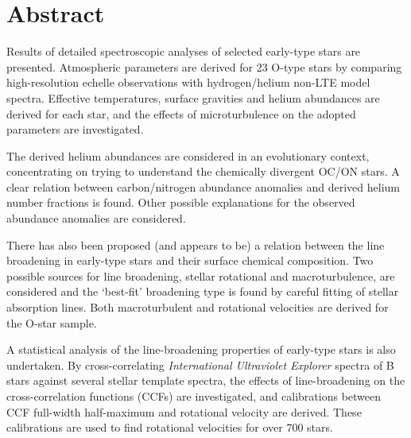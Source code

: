 \chapter*{Abstract}

Results of detailed spectroscopic analyses of selected early-type stars are
presented. Atmospheric parameters are derived for 23 O-type stars by
comparing high-resolution echelle observations with hydrogen/helium
non-LTE model spectra. Effective temperatures, surface gravities and
helium abundances are derived for each star, and the effects of
microturbulence on the adopted parameters are investigated.

The derived helium abundances are considered in an evolutionary
context, concentrating on trying to understand the chemically
divergent OC/ON stars. A clear relation between carbon/nitrogen
abundance anomalies and derived helium number fractions is found.
Other possible explanations for the observed abundance anomalies are
considered.

There has also been proposed (and appears to be) a relation between the
line broadening in early-type stars and their surface chemical
composition. Two possible sources for line broadening,
stellar rotational and macroturbulence, are considered and the
`best-fit' broadening type is found by careful fitting of stellar
absorption lines. Both macroturbulent and rotational velocities are
derived for the O-star sample.

A statistical analysis of the line-broadening properties of early-type
stars is also undertaken. By cross-correlating \emph{International
Ultraviolet Explorer} spectra of B stars against several stellar
template spectra, the effects of line-broadening on the
cross-correlation functions (CCFs) are investigated, and calibrations
between CCF full-width half-maximum and rotational velocity are
derived. These calibrations are used to find rotational velocities for
over 700 stars.





